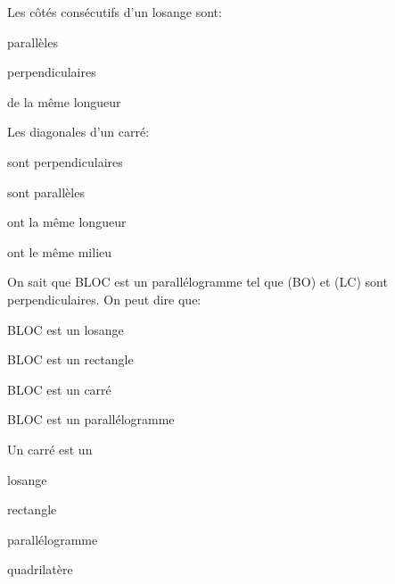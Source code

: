 \begin{QCM}
\begin{GroupeQCM}
\begin{exercice}
     Les côtés consécutifs d'un losange sont:
      \begin{ChoixQCM}{3}
      \item parallèles
      \item perpendiculaires
      \item de la même longueur
      \end{ChoixQCM}
\begin{corrige}
   \end{corrige}
    \end{exercice}

\begin{exercice}
     Les diagonales d'un carré:
      \begin{ChoixQCM}{4}
      \item sont perpendiculaires
      \item sont parallèles
      \item ont la même longueur
      \item ont le même milieu
      \end{ChoixQCM}
\begin{corrige}
   \end{corrige}
    \end{exercice}

\begin{exercice}
      On sait que BLOC est un parallélogramme tel que (BO) et (LC) sont perpendiculaires. On peut dire que:
      \begin{ChoixQCM}{4}
      \item BLOC est un losange
      \item BLOC est un rectangle
      \item BLOC est un carré
      \item BLOC est un parallélogramme
      \end{ChoixQCM}
\begin{corrige}
   \end{corrige}
    \end{exercice}

\begin{exercice}
      Un carré est un
      \begin{ChoixQCM}{4}
      \item losange
      \item rectangle
      \item parallélogramme
      \item quadrilatère
      \end{ChoixQCM}
\begin{corrige}
   \end{corrige}
    \end{exercice}


\end{GroupeQCM}
\end{QCM}
